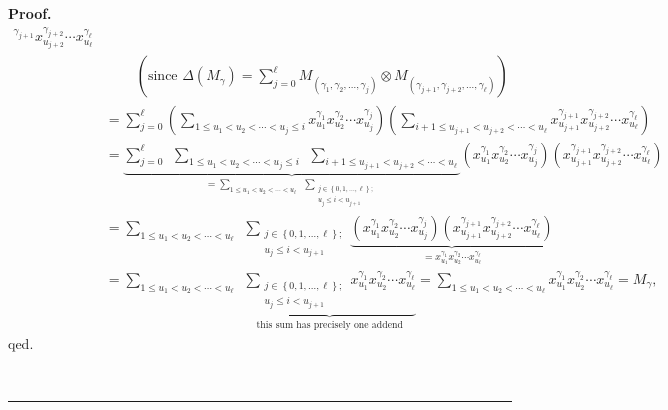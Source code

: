 \documentclass[numbers=enddot,12pt,final,onecolumn,notitlepage,abstracton]{scrartcl}%
\theoremstyle{definition}
\newenvironment{proof}[1][Proof]{\noindent\textbf{#1.} }{\ \rule{0.5em}{0.5em}}
\newenvironment{noncompile}{}{}
\let\sumnonlimits\sum
\renewcommand{\sum}{\sumnonlimits\limits}
\begin{document}
\begin{noncompile}
\begin{proof}
{\begin{align*}
{{{}^{\gamma_{j+1}}x_{u_{j+2}}^{\gamma_{j+2}}\cdots x_{u_{\ell}}^{\gamma_{\ell}}%
}}\\
&  \ \ \ \ \ \ \ \ \ \ \left(  \text{since }\Delta\left(  M_{\gamma}\right)
=\sum_{j=0}^{\ell}M_{\left(  \gamma_{1},\gamma_{2},\ldots,\gamma_{j}\right)
}\otimes M_{\left(  \gamma_{j+1},\gamma_{j+2},\ldots,\gamma_{\ell}\right)
}\right) \\
&  =\sum_{j=0}^{\ell}\left(  \sum_{1\leq u_{1}<u_{2}<\cdots<u_{j}\leq
i}x_{u_{1}}^{\gamma_{1}}x_{u_{2}}^{\gamma_{2}}\cdots x_{u_{j}}^{\gamma_{j}%
}\right)  \left(  \sum_{i+1\leq u_{j+1}<u_{j+2}<\cdots<u_{\ell}}x_{u_{j+1}%
}^{\gamma_{j+1}}x_{u_{j+2}}^{\gamma_{j+2}}\cdots x_{u_{\ell}}^{\gamma_{\ell}%
}\right) \\
&  =\underbrace{\sum_{j=0}^{\ell}\ \ \sum_{1\leq u_{1}<u_{2}<\cdots<u_{j}\leq
i}\ \ \sum_{i+1\leq u_{j+1}<u_{j+2}<\cdots<u_{\ell}}}_{=\sum_{1\leq
u_{1}<u_{2}<\cdots<u_{\ell}}\ \ \sum_{\substack{j\in\left\{  0,1,\ldots
,\ell\right\}  ;\\u_{j}\leq i<u_{j+1}}}}\left(  x_{u_{1}}^{\gamma_{1}}%
x_{u_{2}}^{\gamma_{2}}\cdots x_{u_{j}}^{\gamma_{j}}\right)  \left(
x_{u_{j+1}}^{\gamma_{j+1}}x_{u_{j+2}}^{\gamma_{j+2}}\cdots x_{u_{\ell}%
}^{\gamma_{\ell}}\right) \\
&  =\sum_{1\leq u_{1}<u_{2}<\cdots<u_{\ell}}\ \ \sum_{\substack{j\in\left\{
0,1,\ldots,\ell\right\}  ;\\u_{j}\leq i<u_{j+1}}}\underbrace{\left(  x_{u_{1}%
}^{\gamma_{1}}x_{u_{2}}^{\gamma_{2}}\cdots x_{u_{j}}^{\gamma_{j}}\right)
\left(  x_{u_{j+1}}^{\gamma_{j+1}}x_{u_{j+2}}^{\gamma_{j+2}}\cdots x_{u_{\ell
}}^{\gamma_{\ell}}\right)  }_{=x_{u_{1}}^{\gamma_{1}}x_{u_{2}}^{\gamma_{2}%
}\cdots x_{u_{\ell}}^{\gamma_{\ell}}}\\
&  =\sum_{1\leq u_{1}<u_{2}<\cdots<u_{\ell}}\ \ \underbrace{\sum
_{\substack{j\in\left\{  0,1,\ldots,\ell\right\}  ;\\u_{j}\leq i<u_{j+1}%
}}x_{u_{1}}^{\gamma_{1}}x_{u_{2}}^{\gamma_{2}}\cdots x_{u_{\ell}}%
^{\gamma_{\ell}}}_{\text{this sum has precisely one addend}}=\sum_{1\leq
u_{1}<u_{2}<\cdots<u_{\ell}}x_{u_{1}}^{\gamma_{1}}x_{u_{2}}^{\gamma_{2}}\cdots
x_{u_{\ell}}^{\gamma_{\ell}}=M_{\gamma},
\end{align*}
qed.}


\end{proof}
\end{noncompile}
\end{document}
